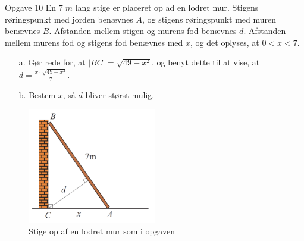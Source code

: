 \documentclass{article}
\begin{document}
\begin{question}{Opgave 10}{}
En $7 \;\unit{m} $ lang stige er placeret op ad en lodret mur.
Stigens røringspunkt med jorden benævnes $A$, og stigens røringspunkt med muren benævnes $B$. 
Afstanden mellem stigen og murens fod benævnes $d$. 
Afstanden mellem murens fod og stigens fod benævnes med $x$, og det oplyses, at $0<x<7$.
\begin{itemize}
  \item[a.] Gør rede for, at $|BC|=\sqrt{49-x^2} $, og benyt dette til at vise, at $d=\frac{x\cdot \sqrt{49-x^2} }{7}$. 
  \item[b.] Bestem $x$, så $d$ bliver størst mulig. 
\end{itemize}
\end{question}
\begin{figure}[H]
\begin{center}
  \includegraphics[width=0.5\textwidth]{mur.png}
\end{center}
\caption{Stige op af en lodret mur som i opgaven}
\label{fig:mur}
\end{figure}
\end{document}
